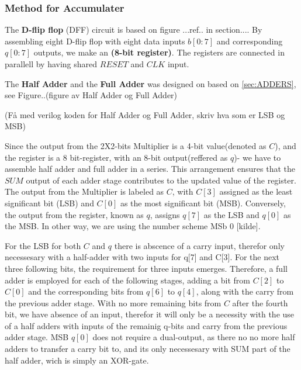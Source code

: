 \subsubsection{Method for Accumulater}

The \textbf{D-flip flop} (DFF) circuit is based on figure ...ref.. in section.... By assembling eight D-flip flop with eight data inputs $b[0:7]$ and corresponding $q[0:7]$ outputs, we make an \textbf{(8-bit register)}. The registers are connected in parallell by having shared $RESET$ and $CLK$ input. 


The \textbf{Half Adder} and the \textbf{Full Adder} was designed on based on \ref{sec:ADDERS}, see Figure..(figure av Half Adder og Full Adder)

(Få med verilog koden for Half Adder og Full Adder, skriv hva som er LSB og MSB)



Since the output from the 2X2-bits Multiplier is a 4-bit value(denoted as $C$), and the register is a 8 bit-register, with an 8-bit output(reffered as $q$)- we have to assemble half adder and full adder in a series. This arrangement ensures that the $SUM$ output of each adder stage contributes to the updated value of the register. The output from the Multiplier is labeled as $C$, with $C[3]$ assigned as the least significant bit (LSB) and $C[0]$ as the most significant bit (MSB). Conversely, the output from the register, known as $q$, assigns $q[7]$ as the LSB and $q[0]$ as the MSB. In other way, we are using the number scheme MSb 0 [kilde].

For the LSB for both $C$ and $q$ there is abscence of a carry input, therefor only necessesary with a half-adder with two inputs for q[7] and C[3]. For the next three following bits, the requirement for three inputs emerges. Therefore, a full adder is employed for each of the following stages, adding a bit from $C[2]$ to $C[0]$ and the corresponding bits from $q[6]$ to $q[4]$, along with the carry from the previous adder stage. With no more remaining bits from $C$ after the fourth bit, we have absence of an input, therefor it will only be a necessity with the use of a half adders with inputs of the remainig q-bits and carry from the previous adder stage. MSB $q[0]$ does not require a dual-output, as there no no more half adders to transfer a carry bit to, and its only necessesary with SUM part of the half adder, wich is simply an XOR-gate.

 





